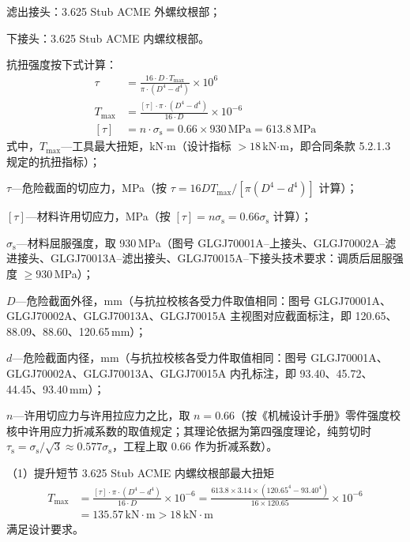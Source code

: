 滤出接头：3.625 Stub ACME 外螺纹根部；

下接头：3.625 Stub ACME 内螺纹根部。

抗扭强度按下式计算：
\begin{equation}
    \begin{aligned}
        \tau &= \frac{16 \cdot D \cdot T_{\max}}{\pi \cdot (D^4 - d^4)} \times 10^{6} \\
        T_{\max} &= \frac{[\tau] \cdot \pi \cdot (D^4 - d^4)}{16 \cdot D} \times 10^{-6} \\
        [\tau] &= n \cdot \sigma_{\mathrm{s}} = 0.66 \times 930\,\text{MPa} = 613.8\,\text{MPa}
    \end{aligned}
\end{equation}
式中，$T_{\max}$---工具最大扭矩，kN$\cdot$m（设计指标 $>18$\,kN$\cdot$m，即合同条款 5.2.1.3 规定的抗扭指标）；

$\tau$---危险截面的切应力，MPa（按 $\tau = 16DT_{\max}/[\pi(D^4-d^4)]$ 计算）；

$[\tau]$---材料许用切应力，MPa（按 $[\tau]=n\sigma_{\mathrm{s}} = 0.66\sigma_{\mathrm{s}}$ 计算）；

$\sigma_{\mathrm{s}}$---材料屈服强度，取 930\,MPa（图号 GLGJ70001A--上接头、GLGJ70002A--滤进接头、GLGJ70013A--滤出接头、GLGJ70015A--下接头技术要求：调质后屈服强度 $\ge 930$\,MPa）；

$D$---危险截面外径，mm（与抗拉校核各受力件取值相同：图号 GLGJ70001A、GLGJ70002A、GLGJ70013A、GLGJ70015A 主视图对应截面标注，即 120.65、88.09、88.60、120.65\,mm）；

$d$---危险截面内径，mm（与抗拉校核各受力件取值相同：图号 GLGJ70001A、GLGJ70002A、GLGJ70013A、GLGJ70015A 内孔标注，即 93.40、45.72、44.45、93.40\,mm）；

$n$---许用切应力与许用拉应力之比，取 $n=0.66$（按《机械设计手册》零件强度校核中许用应力折减系数的取值规定\cite{ref26}；其理论依据为第四强度理论，纯剪切时 $\tau_{\mathrm{s}} = \sigma_{\mathrm{s}}/\sqrt{3} \approx 0.577\sigma_{\mathrm{s}}$，工程上取 $0.66$ 作为折减系数）。

（1）提升短节 3.625 Stub ACME 内螺纹根部最大扭矩
\begin{equation}
    \begin{aligned}
        T_{\max} &= \frac{[\tau] \cdot \pi \cdot (D^4 - d^4)}{16 \cdot D} \times 10^{-6}
                 = \frac{613.8 \times 3.14 \times (120.65^4 - 93.40^4)}{16 \times 120.65} \times 10^{-6} \\
                 &= 135.57\,\text{kN} \cdot \text{m} > 18\,\text{kN} \cdot \text{m}
    \end{aligned}
\end{equation}
满足设计要求。

